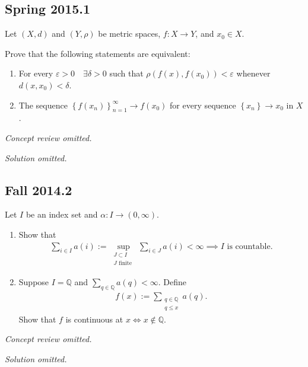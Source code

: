\hypertarget{spring-2015.1}{%
\subsection{Spring 2015.1}\label{spring-2015.1}}

Let \((X, d)\) and \((Y, \rho)\) be metric spaces, \(f: X\to Y\), and
\(x_0 \in X\).

Prove that the following statements are equivalent:

\begin{enumerate}
\def\labelenumi{\arabic{enumi}.}
\tightlist
\item
  For every \(\varepsilon > 0 \quad \exists \delta > 0\) such that
  \(\rho( f(x), f(x_0) ) < \varepsilon\) whenever
  \(d(x, x_0) < \delta\).
\item
  The sequence \(\left\{{f(x_n)}\right\}_{n=1}^\infty \to f(x_0)\) for
  every sequence \(\left\{{x_n}\right\} \to x_0\) in \(X\).
\end{enumerate}

\emph{Concept review omitted.}

\emph{Solution omitted.}

\hypertarget{fall-2014.2}{%
\subsection{Fall 2014.2}\label{fall-2014.2}}

Let \(I\) be an index set and \(\alpha: I \to (0, \infty)\).

\begin{enumerate}
\def\labelenumi{\alph{enumi}.}
\item
  Show that
  \begin{align*}
  \sum_{i \in I} a(i):=\sup _{\substack{ J \subset I \\ J \text { finite }}} \sum_{i \in J} a(i)<\infty \implies I \text{ is countable.}
  \end{align*}
\item
  Suppose \(I = {\mathbb{Q}}\) and
  \(\sum_{q \in \mathbb{Q}} a(q)<\infty\). Define
  \begin{align*}
  f(x):=\sum_{\substack{q \in \mathbb{Q}\\ q \leq x}} a(q).
  \end{align*}
  Show that \(f\) is continuous at \(x \iff x\not\in {\mathbb{Q}}\).
\end{enumerate}

\emph{Concept review omitted.}

\emph{Solution omitted.}

